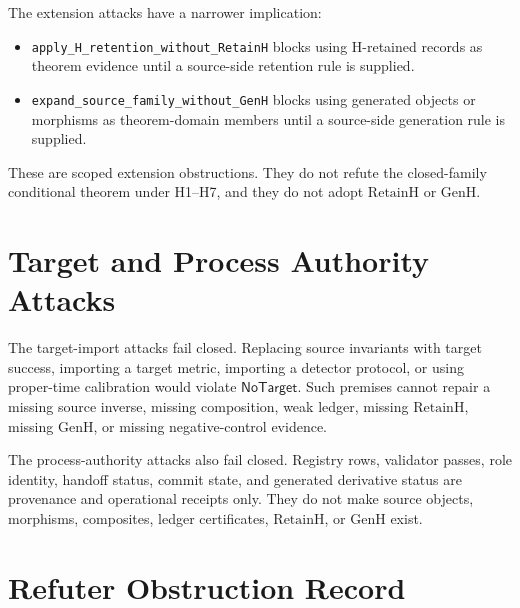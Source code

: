 \documentclass[11pt]{article}
\newcommand{\RetainH}{\mathrm{RetainH}}
\newcommand{\GenH}{\mathrm{GenH}}
\newcommand{\NoTarget}{\mathsf{NoTarget}}
\begin{document}
The extension attacks have a narrower implication:
\begin{itemize}[leftmargin=*]
  \item \texttt{apply\_H\_retention\_without\_RetainH} blocks using
  H-retained records as theorem evidence until a source-side retention rule is
  supplied.
  \item \texttt{expand\_source\_family\_without\_GenH} blocks using generated
  objects or morphisms as theorem-domain members until a source-side generation
  rule is supplied.
\end{itemize}

These are scoped extension obstructions. They do not refute the closed-family
conditional theorem under H1--H7, and they do not adopt \(\RetainH\) or
\(\GenH\).

\section{Target and Process Authority Attacks}

The target-import attacks fail closed. Replacing source invariants with target
success, importing a target metric, importing a detector protocol, or using
proper-time calibration would violate \(\NoTarget\). Such premises cannot
repair a missing source inverse, missing composition, weak ledger, missing
\(\RetainH\), missing \(\GenH\), or missing negative-control evidence.

The process-authority attacks also fail closed. Registry rows, validator
passes, role identity, handoff status, commit state, and generated derivative
status are provenance and operational receipts only. They do not make source
objects, morphisms, composites, ledger certificates, \(\RetainH\), or
\(\GenH\) exist.

\section{Refuter Obstruction Record}
\end{document}
